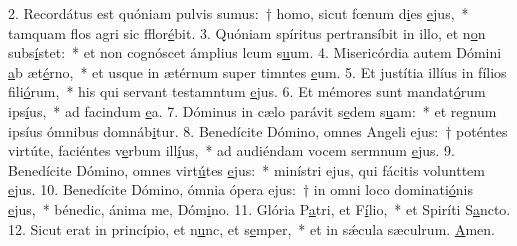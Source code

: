 2. Recordátus est quóniam pulvis sumus:~† homo, sicut fœnum d\uline{i}es \uline{e}jus,~* tamquam flos agri sic fflor\uline{é}bit.
3. Quóniam spíritus pertransíbit in illo, et n\uline{o}n subs\uline{í}stet:~* et non cognóscet ámplius lcum s\uline{u}um.
4. Misericórdia autem Dómini \uline{a}b æt\uline{é}rno,~* et usque in ætérnum super timntes \uline{e}um.
5. Et justítia illíus in fílios f\uline{i}li\uline{ó}rum,~* his qui servant testamntum \uline{e}jus.
6. Et mémores sunt mandat\uline{ó}rum ips\uline{í}us,~* ad facindum \uline{e}a.
7. Dóminus in cælo parávit s\uline{e}dem s\uline{u}am:~* et regnum ipsíus ómnibus domnáb\uline{i}tur.
8. Benedícite Dómino, omnes Angeli ejus:~† poténtes virtúte, faciéntes v\uline{e}rbum ill\uline{í}us,~* ad audiéndam vocem sermnum \uline{e}jus.
9. Benedícite Dómino, omnes virt\uline{ú}tes \uline{e}jus:~* minístri ejus, qui fácitis volunttem \uline{e}jus.
10. Benedícite Dómino, ómnia ópera ejus:~† in omni loco dominati\uline{ó}nis \uline{e}jus,~* bénedic, ánima me, Dóm\uline{i}no.
11. Glória P\uline{a}tri, et F\uline{í}lio,~* et Spiríti S\uline{a}ncto.
12. Sicut erat in princípio, et n\uline{u}nc, et s\uline{e}mper,~* et in sǽcula sæculrum. \uline{A}men.
